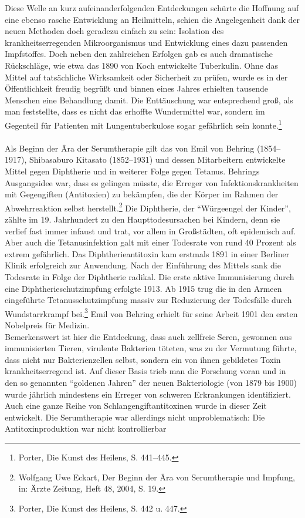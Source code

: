 \documentclass[
    a4paper,
    12pt,
    hyphens,
    chapterprefix=true,
    headheight=33pt,
    footheight=29pt,
    headings=optiontohead,
]{scrartcl}
\begin{document}
Diese Welle an kurz aufeinanderfolgenden Entdeckungen schürte die Hoffnung auf eine ebenso rasche Entwicklung an Heilmitteln, schien die Angelegenheit dank der neuen Methoden doch geradezu einfach zu sein: Isolation des krankheitserregenden Mikroorganismus und Entwicklung eines dazu passenden Impfstoffes. Doch neben den zahlreichen Erfolgen gab es auch dramatische Rückschläge, wie etwa das 1890 von Koch entwickelte Tuberkulin. Ohne das Mittel auf tatsächliche Wirksamkeit oder Sicherheit zu prüfen, wurde es in der Öffentlichkeit freudig begrüßt und binnen eines Jahres erhielten tausende Menschen eine Behandlung damit. Die Enttäuschung war entsprechend groß, als man feststellte, dass es nicht das erhoffte Wundermittel war, sondern im Gegenteil für Patienten mit Lungentuberkulose sogar gefährlich sein konnte.\footnote{Porter, Die Kunst des Heilens, S. 441--445.}\\
\\
Als Beginn der Ära der Serumtherapie gilt das von Emil von Behring (1854--1917), Shibasaburo Kitasato (1852--1931) und
dessen Mitarbeitern entwickelte Mittel gegen Diphtherie und in weiterer Folge gegen Tetanus. Behrings Ausgangsidee war,
dass es gelingen müsste, die Erreger von Infektionskrankheiten mit Gegengiften (Antitoxien) zu bekämpfen, die der Körper
im Rahmen der Abwehrreaktion selbst herstellt.\footnote{Wolfgang Uwe Eckart, Der Beginn der Ära von Serumtherapie und Impfung,
in: Ärzte Zeitung, Heft 48, 2004, S. 19.} Die Diphtherie, der "`Würgeengel der Kinder"', zählte im 19. Jahrhundert zu den Haupttodesursachen
bei Kindern, denn sie verlief fast immer infaust und trat, vor allem in Großstädten, oft epidemisch auf.
Aber auch die Tetanusinfektion galt mit einer Todesrate von rund 40 Prozent
als extrem gefährlich. Das Diphtherieantitoxin kam erstmals 1891 in einer Berliner Klinik erfolgreich zur Anwendung.
Nach der Einführung des Mittels sank die Todesrate in Folge der Diphtherie radikal.
Die erste aktive Immunisierung durch eine Diphtherieschutzimpfung erfolgte 1913. Ab 1915 trug die in den Armeen eingeführte
Tetanusschutzimpfung massiv zur Reduzierung der Todesfälle durch Wundstarrkrampf bei.\footnote{Porter, Die Kunst des Heilens,
S. 442 u. 447.} Emil von Behring erhielt für seine Arbeit 1901 den ersten Nobelpreis für Medizin.\\
Bemerkenswert ist hier die Entdeckung, dass auch zellfreie Seren, gewonnen aus immunisierten Tieren, virulente Bakterien töteten, was zu der Vermutung führte, dass nicht nur Bakterienzellen selbst, sondern ein von ihnen gebildetes Toxin krankheitserregend ist. Auf dieser Basis trieb man die Forschung voran und in den so genannten "`goldenen Jahren"' der neuen Bakteriologie (von 1879 bis 1900) wurde jährlich mindestens ein Erreger von schweren Erkrankungen identifiziert. Auch eine ganze Reihe von Schlangengiftantitoxinen wurde in dieser Zeit entwickelt. Die Serumtherapie war allerdings nicht unproblematisch: Die Antitoxinproduktion war nicht kontrollierbar
\end{document}
